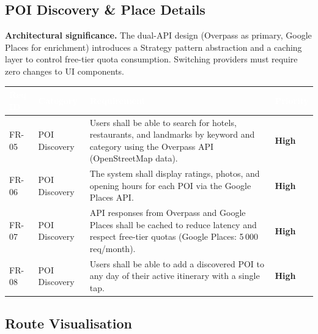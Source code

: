 \documentclass[12pt, a4paper]{article}
\newcommand{\reqid}[1]{\textsc{\small #1}}
\newcommand{\high}{\textbf{High}}
\newcommand{\thcell}[1]{\textcolor{white}{\textbf{\small #1}}}
\begin{document}
\subsection{POI Discovery \& Place Details}

\begin{tcolorbox}[notebox]
  \textbf{Architectural significance.} The dual-API design (Overpass as primary, Google Places for enrichment) introduces a Strategy pattern abstraction and a caching layer to control free-tier quota consumption. Switching providers must require zero changes to UI components.
\end{tcolorbox}

\vspace{0.4em}
\begin{longtable}{C{1.6cm} C{2.0cm} L{8.2cm} C{1.8cm}}
\toprule
{}
\thcell{Req ID} & \thcell{Category} & \thcell{Requirement} & \thcell{Priority} \\
\midrule
\endhead
\bottomrule
\endfoot

\reqid{FR-05} & POI Discovery &
Users shall be able to search for hotels, restaurants, and landmarks by keyword and category using the Overpass API (OpenStreetMap data). &
\high \\

\reqid{FR-06} & POI Discovery &
The system shall display ratings, photos, and opening hours for each POI via the Google Places API. &
\high \\

\reqid{FR-07} & POI Discovery &
API responses from Overpass and Google Places shall be cached to reduce latency and respect free-tier quotas (Google Places: 5\,000 req/month). &
\high \\

\reqid{FR-08} & POI Discovery &
Users shall be able to add a discovered POI to any day of their active itinerary with a single tap. &
\high \\

\end{longtable}

\subsection{Route Visualisation}
\end{document}
